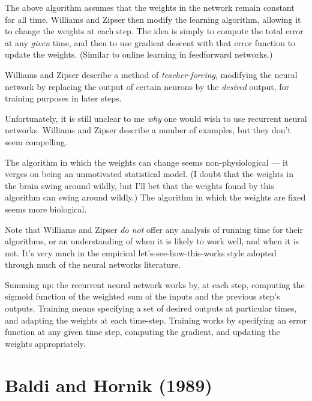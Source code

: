 \documentclass[12pt]{report}
\begin{document}
The above algorithm assumes that the weights in the network remain
constant for all time.  Williams and Zipser then modify the learning
algorithm, allowing it to change the weights at each step.  The idea
is simply to compute the total error at any \emph{given} time, and
then to use gradient descent with that error function to update the
weights.  (Similar to online learning in feedforward networks.)
  
Williams and Zipser describe a method of \emph{teacher-forcing},
modifying the neural network by replacing the output of certain
neurons by the \emph{desired} output, for training purposes in later
steps.
  
Unfortunately, it is still unclear to me \emph{why} one would wish to
use recurrent neural networks.  Williams and Zipser describe a number
of examples, but they don't seem compelling.

The algorithm in which the weights can change seems non-physiological
--- it verges on being an unmotivated statistical model.  (I doubt
that the weights in the brain swing around wildly, but I'll bet that
the weights found by this algorithm can swing around wildly.)  The
algorithm in which the weights are fixed seems more biological.
  
Note that Williams and Zipser \emph{do not} offer any analysis of
running time for their algorithms, or an understanding of when it is
likely to work well, and when it is not.  It's very much in the
empirical let's-see-how-this-works style adopted through much of the
neural networks literature.
  
Summing up: the recurrent neural network works by, at each step,
computing the sigmoid function of the weighted sum of the inputs and
the previous step's outputs.  Training means specifying a set of
desired outputs at particular times, and adapting the weights at each
time-step.  Training works by specifying an error function at any
given time step, computing the gradient, and updating the weights
appropriately.


\section{Baldi and Hornik (1989)}
\end{document}
